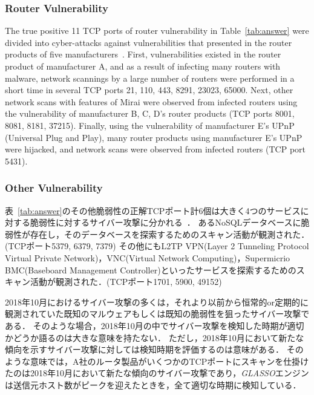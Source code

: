 \documentclass[conference]{IEEEtran}
\begin{document}
\subsubsection{Router Vulnerability}
The true positive 11 TCP ports of router vulnerability in Table~\ref{tab:answer} were divided into cyber-attacks against vulnerabilities that presented in the router products of five manufacturers~\cite{Huawei,Netlab_BCM,Netlab_MikroTik}.
First, vulnerabilities existed in the router product of manufacturer A, and as a result of infecting many routers with malware, network scannings by a large number of routers were performed in a short time in several TCP ports 21, 110, 443, 8291, 23023, 65000.
Next, other network scans with features of Mirai were observed from infected routers using the vulnerability of manufacturer B, C, D's router products (TCP ports 8001, 8081, 8181, 37215).
Finally, using the vulnerability of manufacturer E's UPnP (Universal Plug and Play), many router products using manufacturer E's UPnP were hijacked, and network scans were observed from infected routers (TCP port 5431).



\subsubsection{Other Vulnerability}
表~\ref{tab:answer}のその他脆弱性の正解TCPポート計6個は大きく4つのサービスに対する脆弱性に対するサイバー攻撃に分かれる~\cite{Imperva}．
あるNoSQLデータベースに脆弱性が存在し，そのデータベースを探索するためのスキャン活動が観測された．(TCPポート5379, 6379, 7379)
その他にもL2TP VPN(Layer 2 Tunneling Protocol Virtual Private Network)，VNC(Virtual Network Computing)，Supermicrio BMC(Baseboard Management Controller)といったサービスを探索するためのスキャン活動が観測された．(TCPポート1701, 5900, 49152)


2018年10月におけるサイバー攻撃の多くは，それより以前から恒常的or定期的に観測されていた既知のマルウェアもしくは既知の脆弱性を狙ったサイバー攻撃である．
そのような場合，2018年10月の中でサイバー攻撃を検知した時期が適切かどうか語るのは大きな意味を持たない．
ただし，2018年10月において新たな傾向を示すサイバー攻撃に対しては検知時期を評価するのは意味がある．
そのような意味では，A社のルータ製品がいくつかのTCPポートにスキャンを仕掛けたのは2018年10月において新たな傾向のサイバー攻撃であり，{\it GLASSO}エンジンは送信元ホスト数がピークを迎えたときを，全て適切な時期に検知している．



\end{document}
